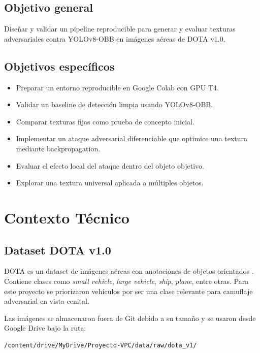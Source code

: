 \documentclass[12pt,a4paper]{article}
\begin{document}
\subsection{Objetivo general}

Diseñar y validar un pipeline reproducible para generar y evaluar texturas adversariales contra YOLOv8-OBB en imágenes aéreas de DOTA v1.0.

\subsection{Objetivos específicos}

\begin{itemize}
    \item Preparar un entorno reproducible en Google Colab con GPU T4.
    \item Validar un baseline de detección limpia usando YOLOv8-OBB.
    \item Comparar texturas fijas como prueba de concepto inicial.
    \item Implementar un ataque adversarial diferenciable que optimice una textura mediante backpropagation.
    \item Evaluar el efecto local del ataque dentro del objeto objetivo.
    \item Explorar una textura universal aplicada a múltiples objetos.
\end{itemize}

\section{Contexto Técnico}

\subsection{Dataset DOTA v1.0}

DOTA es un dataset de imágenes aéreas con anotaciones de objetos orientados \cite{dota}. Contiene clases como \textit{small vehicle}, \textit{large vehicle}, \textit{ship}, \textit{plane}, entre otras. Para este proyecto se priorizaron vehículos por ser una clase relevante para camuflaje adversarial en vista cenital.

Las imágenes se almacenaron fuera de Git debido a su tamaño y se usaron desde Google Drive bajo la ruta:

\begin{verbatim}
/content/drive/MyDrive/Proyecto-VPC/data/raw/dota_v1/
\end{verbatim}
\end{document}

